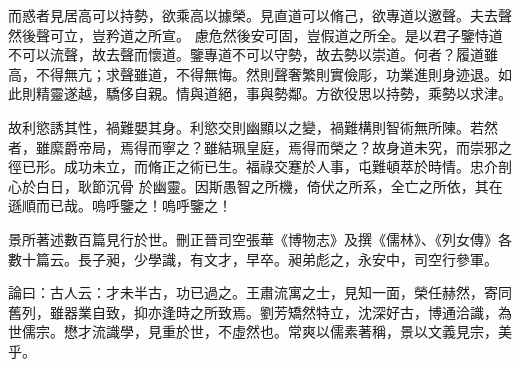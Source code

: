 \begin{pinyinscope}
 而惑者見居高可以持勢，欲乘高以據榮。見直道可以脩己，欲專道以邀聲。夫去聲然後聲可立，豈矜道之所宣。
 慮危然後安可固，豈假道之所全。是以君子鑒恃道不可以流聲，故去聲而懷道。鑒專道不可以守勢，故去勢以崇道。何者？履道雖高，不得無亢；求聲雖道，不得無悔。然則聲奢繁則實儉彫，功業進則身迹退。如此則精靈遂越，驕侈自親。情與道絕，事與勢鄰。方欲役思以持勢，乘勢以求津。



 故利慾誘其性，禍難嬰其身。利慾交則幽顯以之變，禍難構則智術無所陳。若然者，雖縻爵帝局，焉得而寧之？雖結珮皇庭，焉得而榮之？故身道未究，而崇邪之徑已形。成功未立，而脩正之術已生。福祿交蹇於人事，屯難頓萃於時情。忠介剖心於白日，耿節沉骨
 於幽靈。因斯愚智之所機，倚伏之所系，全亡之所依，其在遜順而已哉。嗚呼鑒之！嗚呼鑒之！



 景所著述數百篇見行於世。刪正晉司空張華《博物志》及撰《儒林》、《列女傳》各數十篇云。長子昶，少學識，有文才，早卒。昶弟彪之，永安中，司空行參軍。



 論曰：古人云：才未半古，功已過之。王肅流寓之士，見知一面，榮任赫然，寄同舊列，雖器業自致，抑亦逢時之所致焉。劉芳矯然特立，沈深好古，博通洽識，為世儒宗。懋才流識學，見重於世，不虛然也。常爽以儒素著稱，景以文義見宗，美乎。



\end{pinyinscope}